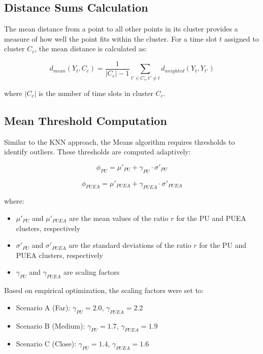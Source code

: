 \subsection{Distance Sums Calculation}

The mean distance from a point to all other points in its cluster provides a measure of how well the point fits within the cluster. For a time slot $t$ assigned to cluster $C_c$, the mean distance is calculated as:

\begin{equation}
    d_{mean}(Y_t, C_c) = \frac{1}{|C_c|-1} \sum_{t' \in C_c, t' \neq t} d_{weighted}(Y_t, Y_{t'})
\end{equation}

where $|C_c|$ is the number of time slots in cluster $C_c$.

\subsection{Mean Threshold Computation}

Similar to the KNN approach, the Means algorithm requires thresholds to identify outliers. These thresholds are computed adaptively:

\begin{equation}
    \phi_{PU} = \mu'_{PU} + \gamma_{PU} \cdot \sigma'_{PU}
\end{equation}

\begin{equation}
    \phi_{PUEA} = \mu'_{PUEA} + \gamma_{PUEA} \cdot \sigma'_{PUEA}
\end{equation}

where:
\begin{itemize}
    \item $\mu'_{PU}$ and $\mu'_{PUEA}$ are the mean values of the ratio $r$ for the PU and PUEA clusters, respectively
    \item $\sigma'_{PU}$ and $\sigma'_{PUEA}$ are the standard deviations of the ratio $r$ for the PU and PUEA clusters, respectively
    \item $\gamma_{PU}$ and $\gamma_{PUEA}$ are scaling factors
\end{itemize}

Based on empirical optimization, the scaling factors were set to:
\begin{itemize}
    \item Scenario A (Far): $\gamma_{PU} = 2.0$, $\gamma_{PUEA} = 2.2$
    \item Scenario B (Medium): $\gamma_{PU} = 1.7$, $\gamma_{PUEA} = 1.9$
    \item Scenario C (Close): $\gamma_{PU} = 1.4$, $\gamma_{PUEA} = 1.6$
\end{itemize}

